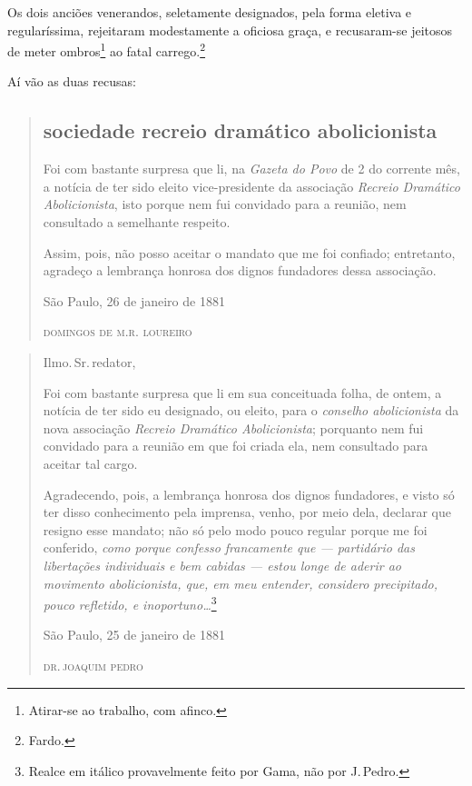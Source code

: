 Os dois anciões venerandos, seletamente designados, pela forma eletiva e
regularíssima, rejeitaram modestamente a oficiosa graça, e recusaram-se
jeitosos de meter ombros\footnote{Atirar-se ao trabalho, com afinco.}
ao fatal carrego.\footnote{Fardo.}

Aí vão as duas recusas:

\begin{quote}
\subsection{sociedade recreio dramático abolicionista}

Foi com bastante surpresa que li, na \emph{Gazeta do Povo} de 2 do
corrente mês, a notícia de ter sido eleito vice-presidente da associação
\emph{Recreio Dramático Abolicionista}, isto porque nem fui convidado
para a reunião, nem consultado a semelhante respeito.

Assim, pois, não posso aceitar o mandato que me foi confiado;
entretanto, agradeço a lembrança honrosa dos dignos fundadores dessa
associação.\medskip

\hfill{}São Paulo, 26 de janeiro de 1881

\hfill\textsc{domingos de m.r. loureiro}
\end{quote}

\asterisc

\begin{quote}
Ilmo.\,Sr.\,redator,

Foi com bastante surpresa que li em sua conceituada folha, de ontem, a
notícia de ter sido eu designado, ou eleito, para o \emph{conselho
abolicionista} da nova associação \emph{Recreio Dramático
Abolicionista}; porquanto nem fui convidado para a reunião em que foi
criada ela, nem consultado para aceitar tal cargo.

Agradecendo, pois, a lembrança honrosa dos dignos fundadores, e visto só
ter disso conhecimento pela imprensa, venho, por meio dela, declarar que
resigno esse mandato; não só pelo modo pouco regular porque me foi
conferido, \emph{como porque confesso francamente que --- partidário
das libertações individuais e bem cabidas --- estou longe de aderir ao
movimento abolicionista, que, em meu entender, considero precipitado,
pouco refletido, e inoportuno\ldots{}}\footnote{Realce em itálico
  provavelmente feito por Gama, não por J.\,Pedro.}\medskip

\hfill{}São Paulo, 25 de janeiro de 1881

\hfill\textsc{dr.\,joaquim pedro}
\end{quote}

